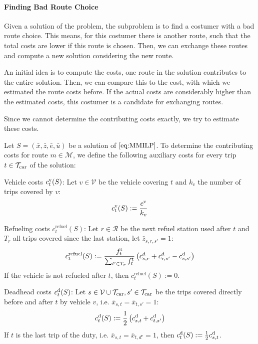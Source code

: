 \paragraph{Finding Bad Route Choice} \parfill

Given a solution of the problem, the subproblem is to find a costumer with a bad route choice. This means, for this costumer there is another route, such that the total costs are lower if this route is chosen. Then, we can exchange these routes and compute a new solution considering the new route. 

An initial idea is to compute the costs, one route in the solution contributes to the entire solution. Then, we can compare this to the cost, with which we estimated the route costs before. If the actual costs are considerably higher than the estimated costs, this costumer is a candidate for exchanging routes.

Since we cannot determine the contributing costs exactly, we try to estimate these costs.

Let $S=\left(\bar{x},\bar{z},\bar{e},\bar{u}\right)$ be a solution of $\eqref{eq:MMILP}$. To determine the contributing costs for route $m\in\mathcal{M}$, we define the following auxiliary costs for every trip $t\in\mathcal{T}_{\operatorname{car}}$ of the solution:

Vehicle costs $c^{\operatorname{v}}_t(S)$: Let $v\in\mathcal{V}$ be the vehicle covering $t$ and $k_v$ the number of trips covered by $v$:
\begin{align*}
	c^{\operatorname{v}}_t(S) := \frac{c^{\operatorname{v}}}{k_v}
\end{align*}

Refueling costs $c^{\operatorname{refuel}}_t(S)$: Let $r\in\mathcal{R}$ be the next refuel station used after $t$ and $T_r$ all trips covered since the last station, let $\bar{z}_{s,r,s'} = 1$:
\begin{align*}
	c^{\operatorname{refuel}}_t(S) := \frac{f^{\operatorname{t}}_t}{\sum_{t'\in T_r} f^{\operatorname{t}}_t}\left(c^{\operatorname{d}}_{s,r}+c^{\operatorname{d}}_{r,s'}-c^{\operatorname{d}}_{s,s'}\right)
\end{align*}
If the vehicle is not refueled after $t$, then $c^{\operatorname{refuel}}_t(S) := 0$.

Deadhead costs $c^{\operatorname{d}}_t(S)$: Let $s\in\mathcal{V}\cup\mathcal{T}_{\operatorname{car}},s'\in\mathcal{T}_{\operatorname{car}}$ be the trips covered directly before and after $t$ by vehicle $v$, i.e. $\bar{x}_{s,t}=\bar{x}_{t,s'}=1$:
\begin{align*}
	c^{\operatorname{d}}_t(S) := \frac 1 2 \left(c^{\operatorname{d}}_{s,t}+c^{\operatorname{d}}_{t,s'}\right)
\end{align*}
If $t$ is the last trip of the duty, i.e. $\bar{x}_{s,t}=\bar{x}_{t,d^{\operatorname{e}}}=1$, then $c^{\operatorname{d}}_t(S) := \frac 1 2 c^{\operatorname{d}}_{s,t}$.

